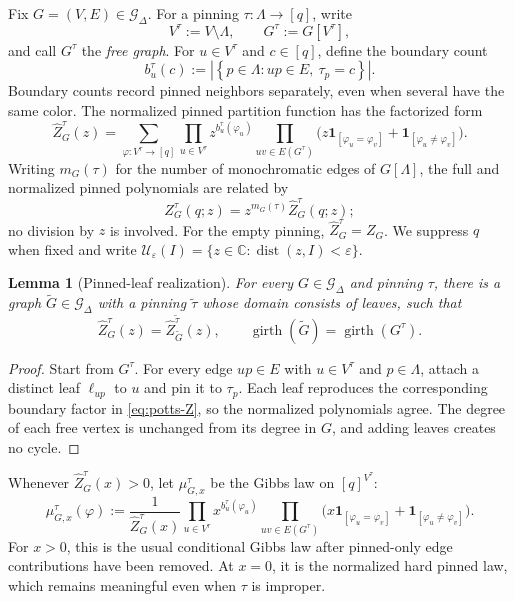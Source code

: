 \documentclass[11pt,reqno]{article}
\theoremstyle{plain}
\newtheorem{lemma}[lemma]{Lemma}
\theoremstyle{definition}
\theoremstyle{remark}
\newcommand{\C}{\mathbb{C}}
\newcommand{\eps}{\varepsilon}
\newcommand{\abs}[1]{\left|#1\right|}
\newcommand{\set}[1]{\left\{#1\right\}}
\newcommand{\dist}{\operatorname{dist}}
\newcommand{\one}[1]{\mathbf{1}_{\left[#1\right]}}   %
\newcommand{\Deg}{\Delta}                        %
\newcommand{\Zpart}{Z}                           %
\newcommand{\colours}{[q]}                        %
\newcommand{\bcount}{b}
\newcommand{\Gdeg}{\mathcal{G}_{\Deg}}
\newcommand{\Zpin}[2]{Z_{#1}^{#2}}
\newcommand{\nZpin}[2]{\widehat Z_{#1}^{#2}}
\newcommand{\mupin}[3]{\mu_{#1,#3}^{#2}}
\begin{document}
Fix \(G=(V,E)\in\Gdeg\).  For a pinning
\(\tau\colon\Lambda\to\colours\), write
\[
  V^\tau:=V\setminus\Lambda,
  \qquad
  G^\tau:=G[V^\tau],
\]
and call \(G^\tau\) the \emph{free graph}.  For \(u\in V^\tau\) and
\(c\in\colours\), define the boundary count
\begin{equation}\label{eq:pin-counts}
  \bcount_u^\tau(c)
  :=\abs{\set{p\in\Lambda:up\in E,\ \tau_p=c}}.
\end{equation}
Boundary counts record pinned neighbors separately, even when several
have the same color.  The normalized pinned partition function has the
factorized form
\begin{equation}\label{eq:potts-Z}
  \nZpin{G}{\tau}(z)
  =\sum_{\varphi\colon V^\tau\to\colours}
     \prod_{u\in V^\tau}z^{\bcount_u^\tau(\varphi_u)}
     \prod_{uv\in E(G^\tau)}
       \bigl(z\one{\varphi_u=\varphi_v}+\one{\varphi_u\ne\varphi_v}\bigr).
\end{equation}
Writing \(m_G(\tau)\) for the number of monochromatic edges of
\(G[\Lambda]\), the full and normalized pinned polynomials are related by
\begin{equation}\label{eq:intro-normalization}
  \Zpin{G}{\tau}(q;z)
  =z^{m_G(\tau)}\nZpin{G}{\tau}(q;z);
\end{equation}
no division by \(z\) is involved.  For the empty pinning,
\(\nZpin{G}{\tau}=\Zpart_G\).  We suppress \(q\) when fixed and write
\(\mathcal U_\eps(I)=\{z\in\C:\dist(z,I)<\eps\}\).

\begin{lemma}[Pinned-leaf realization]\label{lem:pinned-leaf-realization}
For every \(G\in\Gdeg\) and pinning \(\tau\), there is a graph
\(\widetilde G\in\Gdeg\) with a pinning \(\widetilde\tau\) whose domain
consists of leaves, such that
\[
  \nZpin{G}{\tau}(z)
  =\nZpin{\widetilde G}{\widetilde\tau}(z),
  \qquad
  \operatorname{girth}(\widetilde G)
  =\operatorname{girth}(G^\tau).
\]
\end{lemma}

\begin{proof}
Start from \(G^\tau\).  For every edge \(up\in E\) with
\(u\in V^\tau\) and \(p\in\Lambda\), attach a distinct leaf
\(\ell_{up}\) to \(u\) and pin it to \(\tau_p\).  Each leaf reproduces the
corresponding boundary factor in \eqref{eq:potts-Z}, so the normalized
polynomials agree.  The degree of each free vertex is unchanged from its
degree in \(G\), and adding leaves creates no cycle.
\end{proof}

Whenever \(\nZpin{G}{\tau}(x)>0\), let \(\mupin{G}{\tau}{x}\) be the
Gibbs law on \(\colours^{V^\tau}\):
\[
  \mupin{G}{\tau}{x}(\varphi)
  :=\frac{1}{\nZpin{G}{\tau}(x)}
     \prod_{u\in V^\tau}x^{\bcount_u^\tau(\varphi_u)}
     \prod_{uv\in E(G^\tau)}
       \bigl(x\one{\varphi_u=\varphi_v}+\one{\varphi_u\ne\varphi_v}\bigr).
\]
For \(x>0\), this is the usual conditional Gibbs law after pinned-only edge
contributions have been removed.  At \(x=0\), it is the normalized hard
pinned law, which remains meaningful even when \(\tau\) is improper.
\end{document}
